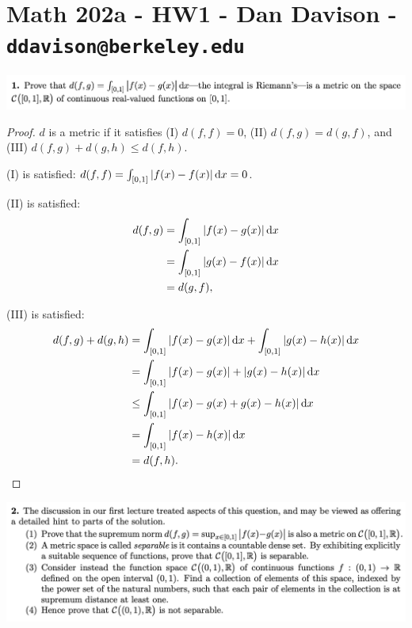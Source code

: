 \section*{Math 202a - HW1 - Dan Davison - \texttt{ddavison@berkeley.edu}}

\begin{mdframed}
  \includegraphics[width=400pt]{img/analysis--berkeley-202a--homework-1-a75a.png}
\end{mdframed}


\begin{proof}
  $d$ is a metric if it satisfies (I) $d(f,f) = 0$, (II) $d(f,g) = d(g, f)$, and (III) $d(f,g) + d(g, h) \le d(f, h)$.

  (I) is satisfied: $d(f, f) = \int_{[0,1]}|f(x) - f(x)| \dx = 0$.

  (II) is satisfied:
  \begin{align*}
    d(f, g)
    &= \int_{[0,1]}|f(x) - g(x)| \dx \\
    &= \int_{[0,1]}|g(x) - f(x)| \dx \\
    &= d(g, f),
  \end{align*}

  (III) is satisfied:
  \begin{align*}
    d(f, g) + d(g, h)
    &= \int_{[0,1]} |f(x) - g(x)| \dx + \int_{[0,1]} |g(x) - h(x)| \dx \\
    &= \int_{[0,1]} |f(x) - g(x)| + |g(x) - h(x)| \dx \\
    &\le \int_{[0,1]} |f(x) - g(x) + g(x) - h(x)| \dx \\
    &= \int_{[0,1]} |f(x) - h(x)| \dx \\
    &= d(f, h).
  \end{align*}
\end{proof}

\newpage
\begin{mdframed}
  \includegraphics[width=400pt]{img/analysis--berkeley-202a--homework-1-d1d3.png}
\end{mdframed}

